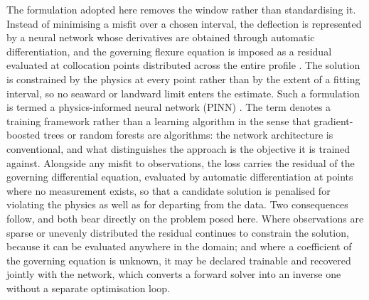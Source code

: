 \documentclass[final]{agujournal2019}
\begin{document}
The formulation adopted here removes the window rather than standardising it.
Instead of minimising a misfit over a chosen interval, the deflection is
represented by a neural network whose derivatives are obtained through automatic
differentiation, and the governing flexure equation is imposed as a residual
evaluated at collocation points distributed across the entire profile
\cite{Raissi2019,Karniadakis2021}. The solution is constrained by the physics at
every point rather than by the extent of a fitting interval, so no seaward or
landward limit enters the estimate. Such a formulation is termed a physics-informed neural network
(PINN) \cite{Raissi2019,Karniadakis2021}. The term denotes a training
framework rather than a learning algorithm in the sense that gradient-boosted
trees or random forests are algorithms: the network architecture is
conventional, and what distinguishes the approach is the objective it is trained
against. Alongside any misfit to observations, the loss carries the residual of
the governing differential equation, evaluated by automatic differentiation at
points where no measurement exists, so that a candidate solution is penalised
for violating the physics as well as for departing from the data. Two
consequences follow, and both bear directly on the problem posed here. Where
observations are sparse or unevenly distributed the residual continues to
constrain the solution, because it can be evaluated anywhere in the domain;
and where a coefficient of the governing equation is unknown, it may be declared
trainable and recovered jointly with the network, which converts a forward
solver into an inverse one without a separate optimisation loop.
\end{document}
